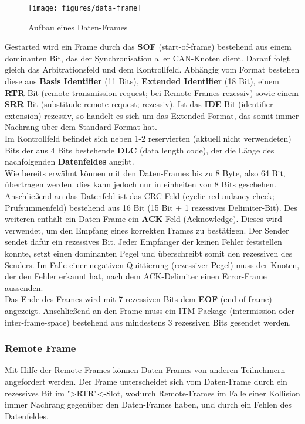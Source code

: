 \begin{figure}[h] 
\centering
\texttt{[image: figures/data-frame]}
\caption{Aufbau eines Daten-Frames \citep{HYC}} 
\label{data}
\end{figure} 
		
Gestarted wird ein Frame durch das \textbf{SOF} (start-of-frame)
bestehend aus einem dominanten Bit, das der Synchronisation aller CAN-Knoten dient. Darauf folgt gleich das
Arbitrationsfeld und dem Kontrollfeld. Abhängig vom Format bestehen
diese aus \textbf{Basis Identifier} (11 Bits), \textbf{Extended
Identifier} (18 Bit), einem \textbf{RTR}-Bit (remote transmission
request; bei Remote-Frames rezessiv) sowie einem \textbf{SRR}-Bit
(substitude-remote-request; rezessiv). Ist das \textbf{IDE}-Bit
(identifier extension) rezessiv, so handelt es sich um das Extended
Format, das somit immer Nachrang über dem Standard Format hat.\\ Im
Kontrollfeld befindet sich neben 1-2 reservierten (aktuell nicht
verwendeten) Bits der aus 4 Bits bestehende \textbf{DLC} (data length
code), der die Länge des nachfolgenden \textbf{Datenfeldes} angibt.\\
Wie bereits erwähnt können mit den Daten-Frames bis zu 8 Byte, also 64
Bit, übertragen werden. dies kann jedoch nur in einheiten von 8 Bits
geschehen. Anschließend an das Datenfeld ist das CRC-Feld (cyclic
redundancy check; Prüfsummenfeld) bestehend aus 16 Bit (15 Bit + 1
rezessives Delimiter-Bit). Des weiteren enthält ein Daten-Frame ein
\textbf{ACK}-Feld (Acknowledge). Dieses wird verwendet, um den Empfang
eines korrekten Frames zu bestätigen. Der Sender sendet dafür ein
rezessives Bit. Jeder Empfänger der keinen Fehler feststellen konnte,
setzt einen dominanten Pegel und überschreibt somit den rezessiven des
Senders. Im Falle einer negativen Quittierung (rezessiver Pegel) muss
der Knoten, der den Fehler erkannt hat, nach dem ACK-Delimiter einen
Error-Frame aussenden.\\Das Ende des Frames wird mit 7 rezessiven Bits
dem \textbf{EOF} (end of frame) angezeigt. Anschließend an den Frame
muss ein ITM-Package (intermission oder inter-frame-space) bestehend
aus mindestens 3 rezessiven Bits gesendet werden.
	
\subsubsection{Remote Frame} Mit Hilfe der Remote-Frames können
Daten-Frames von anderen Teilnehmern angefordert werden. Der Frame
unterscheidet sich vom Daten-Frame durch ein rezessives Bit im
">RTR"<-Slot, wodurch Remote-Frames im Falle einer Kollision immer
Nachrang gegenüber den Daten-Frames haben, und durch ein Fehlen des
Datenfeldes.
	

